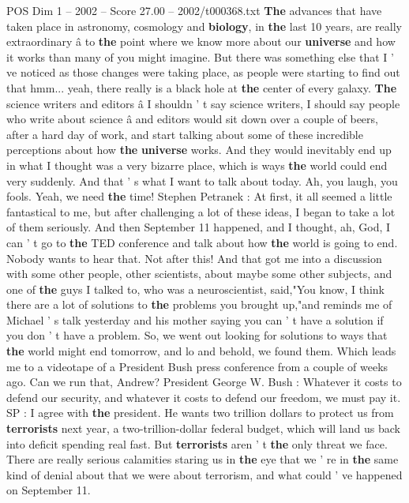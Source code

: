 \begin{textsample}{POS Dim 1 – 2002 – Score 27.00 – 2002/t000368.txt}  \label{ex:f1_pos_017}
\textbf{The} advances that have taken place in astronomy, cosmology and \textbf{biology}, in \textbf{the} last 10 years, are really extraordinary â to \textbf{the} point where we know more about our \textbf{universe} and how it works than many of you might imagine.
But there was something else that I ' ve noticed as those changes were taking place, as people were starting to find out that hmm... yeah, there really is a black hole at \textbf{the} center of every galaxy. \textbf{The} science writers and editors â I shouldn ' t say science writers, I should say people who write about science â and editors would sit down over a couple of beers, after a hard day of work, and start talking about some of these incredible perceptions about how \textbf{the} \textbf{universe} works.
And they would inevitably end up in what I thought was a very bizarre place, which is ways \textbf{the} world could end very suddenly.
And that ' s what I want to talk about today.
Ah, you laugh, you fools.
Yeah, we need \textbf{the} time!
Stephen Petranek : At first, it all seemed a little fantastical to me, but after challenging a lot of these ideas, I began to take a lot of them seriously.
And then September 11 happened, and I thought, ah, God, I can ' t go to \textbf{the} TED conference and talk about how \textbf{the} world is going to end.
Nobody wants to hear that.
Not after this!
And that got me into a discussion with some other people, other scientists, about maybe some other subjects, and one of \textbf{the} guys I talked to, who was a neuroscientist, said,"You know, I think there are a lot of solutions to \textbf{the} problems you brought up,"and reminds me of Michael ' s talk yesterday and his mother saying you can ' t have a solution if you don ' t have a problem.
So, we went out looking for solutions to ways that \textbf{the} world might end tomorrow, and lo and behold, we found them.
Which leads me to a videotape of a President Bush press conference from a couple of weeks ago.
Can we run that, Andrew?
President George W.
Bush : Whatever it costs to defend our security, and whatever it costs to defend our freedom, we must pay it.
SP : I agree with \textbf{the} president.
He wants two trillion dollars to protect us from \textbf{terrorists} next year, a two-trillion-dollar federal budget, which will land us back into deficit spending real fast.
But \textbf{terrorists} aren ' t \textbf{the} only threat we face.
There are really serious calamities staring us in \textbf{the} eye that we ' re in \textbf{the} same kind of denial about that we were about terrorism, and what could ' ve happened on September 11.

\end{textsample}
